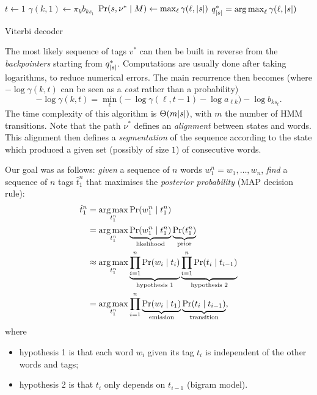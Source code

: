 \begin{algorithm}[H]
	\DontPrintSemicolon
	\SetAlgoLined
	\(t \gets 1\)\;
	\(\gamma(k, 1) \gets \pi_{k} b_{ks_1}\) 
	\(\Pr(s, \nu^* \mid M) \gets \max_{\ell} \gamma(\ell, {\left\lvert s\right\lvert})\) 
	\(q_{{\left\lvert s\right\lvert}}^* = \operatorname*{arg\,max}_{\ell} \gamma(\ell, {\left\lvert s\right\lvert})\)\;
	\caption{Viterbi decoder}
\end{algorithm}
The most likely sequence of tags \(v^*\) can then be built in reverse from the \emph{backpointers} starting from \(q_{\left\lvert s\right\lvert}^*\).
Computations are usually done after taking logarithms, to reduce numerical errors.
The main recurrence then becomes (where \(- \log\gamma(k, t)\) can be seen as a \emph{cost} rather than a probability)
\[
-\log \gamma(k, t) = \min_\ell \big(-\log \gamma(\ell, t-1) - \log a_{\ell k}\big) - \log b_{k s_t}.
\]
The time complexity of this algorithm is \(\Theta(m{\left\lvert s\right\lvert})\), with \(m\) the number of HMM transitions.
Note that the path \(\nu^*\) defines an \emph{alignment} between states and words.
This alignment then defines a \emph{segmentation} of the sequence according to the state which produced a given set (possibly of size \(1\)) of consecutive words.

Our goal was as follows: \emph{given} a sequence of \(n\) words \(w_1^n = w_1, \dots, w_n\), \emph{find} a sequence of \(n\) tags \(\hat{t}_1^n\) that maximises the \emph{posterior probability} (MAP decision rule):
\begin{align*}
\hat{t}_1^n &= \operatorname*{arg\,max}_{t_1^n} \Pr(w_1^n \mid t_1^n)\\
&= \operatorname*{arg\,max}_{t_1^n} \underbrace{\Pr(w_1^n \mid t_1^n)}_{\textnormal{likelihood}} \underbrace{\Pr(t_1^n)}_{\textnormal{prior}}\\
&\approx \operatorname*{arg\,max}_{t_1^n} \underbrace{\prod_{i=1}^n \Pr(w_i \mid t_i)}_{\textnormal{hypothesis 1}} \underbrace{\prod_{i=1}^n \Pr(t_i \mid t_{i-1})}_{\textnormal{hypothesis 2}}\\
&= \operatorname*{arg\,max}_{t_1^n} \prod_{i=1}^n \underbrace{\Pr(w_i \mid t_1)}_{\textnormal{emission}} \underbrace{\Pr(t_i \mid t_{i-1})}_{\textnormal{transition}},
\end{align*}
where
\begin{itemize}
	\item hypothesis 1 is that each word \(w_i\) given its tag \(t_i\) is independent of the other words and tags;
	\item hypothesis 2 is that \(t_i\) only depends on \(t_{i-1}\) (bigram model).
\end{itemize}

